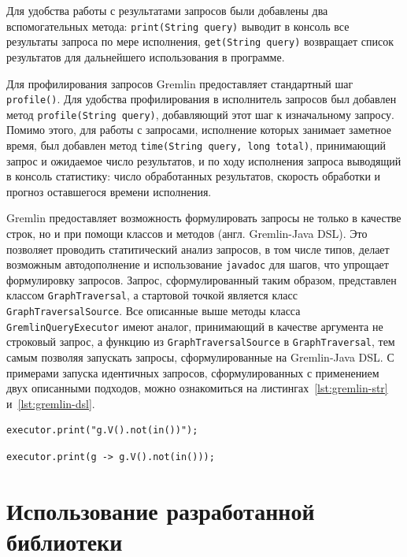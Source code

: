 \documentclass[times,specification,annotation]{itmo-student-thesis}
\begin{document}
Для удобства работы с результатами запросов были добавлены два вспомогательных метода: \texttt{print(String query)} выводит в консоль все результаты запроса по мере исполнения, \texttt{get(String query)} возвращает список результатов для дальнейшего использования в программе.

Для профилирования запросов Gremlin предоставляет стандартный шаг \texttt{profile()}. Для удобства профилирования в исполнитель запросов был добавлен метод \texttt{profile(String query)}, добавляющий этот шаг к изначальному запросу. Помимо этого, для работы с запросами, исполнение которых занимает заметное время, был добавлен метод \texttt{time(String query, long total)}, принимающий запрос и ожидаемое число результатов, и по ходу исполнения запроса выводящий в консоль статистику: число обработанных результатов, скорость обработки и прогноз оставшегося времени исполнения.

Gremlin предоставляет возможность формулировать запросы не только в качестве строк, но и при помощи классов и методов (англ. Gremlin-Java DSL). Это позволяет проводить статитический анализ запросов, в том числе типов, делает возможным автодополнение и использование \texttt{javadoc} для шагов, что упрощает формулировку запросов. Запрос, сформулированный таким образом, представлен классом \texttt{GraphTraversal}, а стартовой точкой является класс \texttt{GraphTraversalSource}. Все описанные выше методы класса \texttt{GremlinQueryExecutor} имеют аналог, принимающий в качестве аргумента не строковый запрос, а функцию из \texttt{GraphTraversalSource} в \texttt{GraphTraversal}, тем самым позволяя запускать запросы, сформулированные на Gremlin-Java DSL. С примерами запуска идентичных запросов, сформулированных с применением двух описанными подходов, можно ознакомиться на листингах~\ref{lst:gremlin-str} и~\ref{lst:gremlin-dsl}.

\begin{lstlisting}[float=!h,caption={Строковый Gremlin  запрос},label={lst:gremlin-str}]
executor.print("g.V().not(in())");
\end{lstlisting}

\begin{lstlisting}[float=!h,caption={Запрос на Gremlin-Java DSL},label={lst:gremlin-dsl}]
executor.print(g -> g.V().not(in()));
\end{lstlisting}

\section{Использование разработанной библиотеки}
\end{document}

